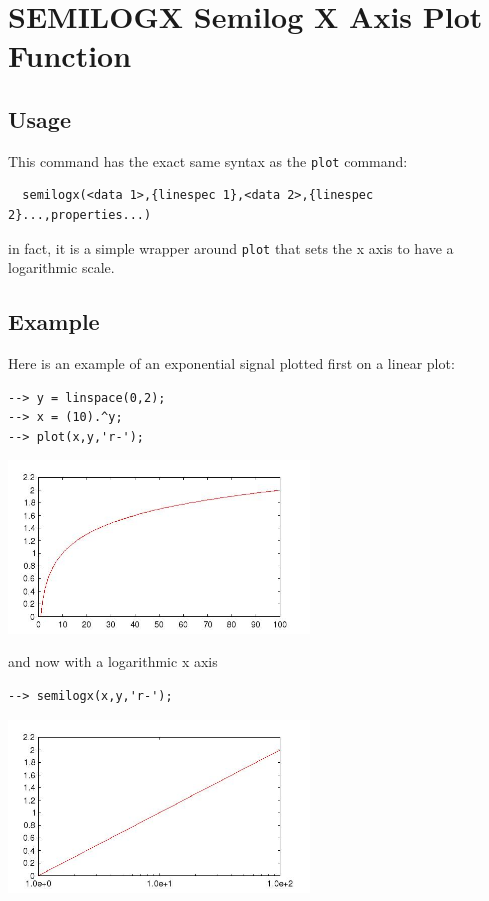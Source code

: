\section{SEMILOGX Semilog X Axis Plot Function}

\subsection{Usage}

This command has the exact same syntax as the \verb|plot| command:
\begin{verbatim}
  semilogx(<data 1>,{linespec 1},<data 2>,{linespec 2}...,properties...)
\end{verbatim}
in fact, it is a simple wrapper around \verb|plot| that sets the
x axis to have a logarithmic scale.
\subsection{Example}

Here is an example of an exponential signal plotted first on a linear
plot:
\begin{verbatim}
--> y = linspace(0,2);
--> x = (10).^y;
--> plot(x,y,'r-');
\end{verbatim}


\centerline{\includegraphics[width=8cm]{semilogx1}}

and now with a logarithmic x axis
\begin{verbatim}
--> semilogx(x,y,'r-');
\end{verbatim}


\centerline{\includegraphics[width=8cm]{semilogx2}}

